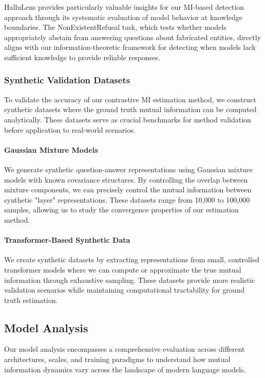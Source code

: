 HalluLens provides particularly valuable insights for our MI-based detection approach through its systematic evaluation of model behavior at knowledge boundaries. The NonExistentRefusal task, which tests whether models appropriately abstain from answering questions about fabricated entities, directly aligns with our information-theoretic framework for detecting when models lack sufficient knowledge to provide reliable responses.

\subsubsection{Synthetic Validation Datasets}

To validate the accuracy of our contrastive MI estimation method, we construct synthetic datasets where the ground truth mutual information can be computed analytically. These datasets serve as crucial benchmarks for method validation before application to real-world scenarios.

\paragraph{Gaussian Mixture Models}
We generate synthetic question-answer representations using Gaussian mixture models with known covariance structures. By controlling the overlap between mixture components, we can precisely control the mutual information between synthetic "layer" representations. These datasets range from 10,000 to 100,000 samples, allowing us to study the convergence properties of our estimation method.

\paragraph{Transformer-Based Synthetic Data}
We create synthetic datasets by extracting representations from small, controlled transformer models where we can compute or approximate the true mutual information through exhaustive sampling. These datasets provide more realistic validation scenarios while maintaining computational tractability for ground truth estimation.

\subsection{Model Analysis}
\label{subsec:model_analysis}

Our model analysis encompasses a comprehensive evaluation across different architectures, scales, and training paradigms to understand how mutual information dynamics vary across the landscape of modern language models.

